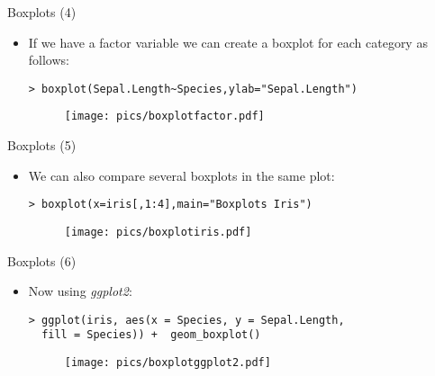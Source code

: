 \documentclass[handout]{beamer}
\begin{document}
\begin{frame}[fragile]{Boxplots (4)}
\scriptsize{
\begin{itemize}

\item If we have a factor variable we can create a boxplot for each category as follows:
\begin{verbatim}
> boxplot(Sepal.Length~Species,ylab="Sepal.Length")
\end{verbatim}

 \begin{figure}[h!]
	\centering
	\texttt{[image: pics/boxplotfactor.pdf]}		
\end{figure} 
 
\end{itemize}

}
\end{frame}
\begin{frame}[fragile]{Boxplots (5)}
\scriptsize{
\begin{itemize}

\item We can also compare several boxplots in the same plot:
\begin{verbatim}
> boxplot(x=iris[,1:4],main="Boxplots Iris")
\end{verbatim}

 \begin{figure}[h!]
	\centering
	\texttt{[image: pics/boxplotiris.pdf]}		
\end{figure} 
 
\end{itemize}

}
\end{frame}



\begin{frame}[fragile]{Boxplots (6)}
\scriptsize{
\begin{itemize}

\item Now using \emph{ggplot2}:
\begin{verbatim}
> ggplot(iris, aes(x = Species, y = Sepal.Length, 
  fill = Species)) +  geom_boxplot()
\end{verbatim}

 \begin{figure}[h!]
	\centering
	\texttt{[image: pics/boxplotggplot2.pdf]}		
\end{figure} 
 
\end{itemize}

}
\end{frame}
\end{document}
